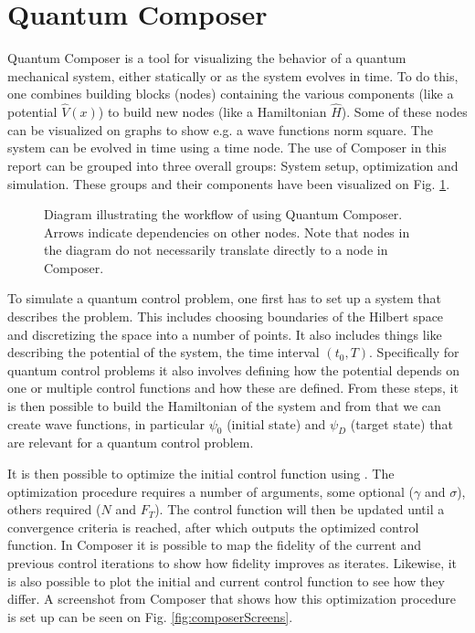 \documentclass[a4paper, twocolumn]{revtex4-1}
\begin{document}
\section{Quantum Composer}\label{sec:Composer}
Quantum Composer is a tool for visualizing the behavior of a quantum mechanical system, either statically or as the system evolves in time. To do this, one combines building blocks (nodes) containing the various components (like a potential $\hat{V}(x)$) to build new nodes (like a Hamiltonian $\hat{H}$). Some of these nodes can be visualized on graphs to show e.g. a wave functions norm square. The system can be evolved in time using a time node. The use of Composer in this report can be grouped into three overall groups: System setup,  optimization and simulation. These groups and their components have been visualized on Fig. \ref{fig:flowdiagram}. 

\begin{figure}
\def\svgwidth{\textwidth}
	
	\caption{Diagram illustrating the workflow of using Quantum Composer. Arrows indicate dependencies on other nodes. Note that nodes in the diagram do not necessarily translate directly to a node in Composer.}
	\label{fig:flowdiagram}
\end{figure}

To simulate a quantum control problem, one first has to set up a system that describes the problem. This includes choosing boundaries of the Hilbert space and discretizing the space into a number of points. It also includes things like describing the potential of the system, the time interval $(t_0, T)$. Specifically for quantum control problems it also involves defining how the potential depends on one or multiple control functions and how these are defined. From these steps, it is then possible to build the Hamiltonian of the system and from that we can create wave functions, in particular $\psi_0$ (initial state) and $\psi_D$ (target state) that are relevant for a quantum control problem.


It is then possible to optimize the initial control function using . The optimization procedure requires a number of arguments, some optional ($\gamma$ and $\sigma$), others required ($N$ and $F_T$). The control function will then be updated until a convergence criteria is reached, after which  outputs the optimized control function. In Composer it is possible to map the fidelity of the current and previous control iterations to show how fidelity improves as  iterates. Likewise, it is also possible to plot the initial and current control function to see how they differ. A screenshot from Composer that shows how this optimization procedure is set up can be seen on Fig. \ref{fig:composerScreens}.
\end{document}
